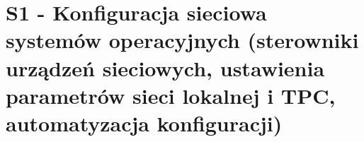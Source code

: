 \section{S1 - Konfiguracja sieciowa systemów operacyjnych (sterowniki urządzeń sieciowych, ustawienia parametrów sieci lokalnej i TPC, automatyzacja konfiguracji)}
